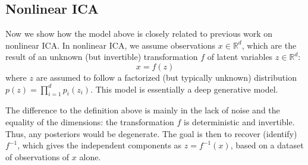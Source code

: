 \subsection{Nonlinear ICA}
Now we show how the model above is closely related to previous work on nonlinear ICA. In nonlinear ICA, we assume observations $x \in \mathbb{R}^{d}$, which are the result of an unknown (but invertible) transformation $f$ of latent variables $z \in \mathbb{R}^{d}$:
\begin{equation*}
x=f(z)
\end{equation*}
where $z$ are assumed to follow a factorized (but typically unknown) distribution $p(z)=\prod_{i=1}^{d} p_{i} \left(z_{i}\right)$. This model is essentially a deep generative model.

The difference to the definition above is mainly in the lack of noise and the equality of the dimensions: the transformation $f$ is deterministic and invertible. Thus, any posteriors would be degenerate. The goal is then to recover (identify) $f^{-1}$, which gives the independent components as $z=f^{-1}(x)$, based on a dataset of observations of $x$ alone.
